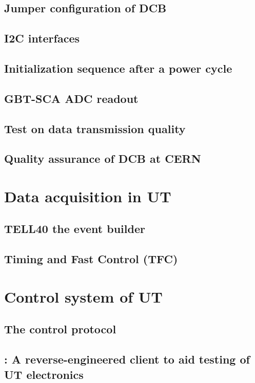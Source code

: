 \subsection{Jumper configuration of DCB}


\subsection{I2C interfaces}


\subsection{Initialization sequence after a power cycle}


\subsection{GBT-SCA ADC readout}


\subsection{Test on data transmission quality}


\subsection{Quality assurance of DCB at CERN}


\section{Data acquisition in UT}
\label{ref:ut:daq}


\subsection{TELL40 the event builder}


\subsection{Timing and Fast Control (TFC)}


\section{Control system of UT}
\label{ref:ut:ctrl}


\subsection{The \dim control protocol}


\subsection{\nanoDAQ: A reverse-engineered \dim client to aid testing of UT electronics}
